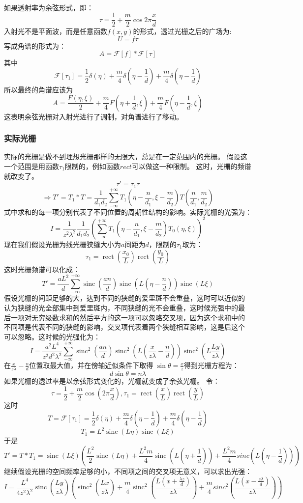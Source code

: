 \documentclass{article}
\DeclareMathOperator{\sinc}{sinc}
\DeclareMathOperator{\rect}{rect}
\begin{document}
\paragraph{}
如果透射率为余弦形式，即：
\[\tau=\frac{1}{2}+\frac{m}{2}\cos{2\pi \frac{x}{d}}\]
入射光不是平面波，而是任意函数$f(x,y)$的形式，透过光栅之后的广场为:
\[U=f\tau\]
写成角谱的形式为：
\[A=\mathscr{F}[f]*\mathscr{F}[\tau]\]
其中
\[\mathscr{F}[\tau_1]=\frac{1}{2}\delta(\eta)+\frac{m}{4}\delta(\eta-\frac{1}{d})+\frac{m}{4}\delta(\eta-\frac{1}{d})\]
所以最终的角谱应该为
\[A=\frac{F(\eta,\xi)}{2}+\frac{m}{4}F(\eta+\frac{1}{d},\xi)+\frac{m}{4}F(\eta-\frac{1}{d},\xi)\]
这表明余弦光栅对入射光进行了调制，对角谱进行了移动。
\subsubsection{实际光栅}
实际的光栅是做不到理想光栅那样的无限大，总是在一定范围内的光栅。
假设这一个范围是用函数$\tau_1$限制的，例如函数$rect$可以做这一种限制。
这时，光栅的频谱就改变了。
\[\tau'=\tau_1\tau\]
\[\Rightarrow
  T'=T_1*T=\frac{1}{d_1d_2}\sum_{-\infty}^{+\infty}T_1(\eta-\frac{n}{d_1},\xi-\frac{m}{d_2})T(\frac{n}{d_1},\frac{m}{d_2})\]
式中求和的每一项分别代表了不同位置的周期性结构的影响。实际光栅的光强为：
\[I=\frac{1}{z^2\lambda^2}\frac{1}{d_1d_2}(\sum_{-\infty}^{+\infty}T_1(\eta-\frac{n}{d_1},\xi-\frac{m}{d_2})T_0(\eta,\xi))^2\]
现在我们假设光栅为线光栅狭缝大小为$a$间距为$d$，限制的$\tau_1$取为：
\[\tau_1=\rect(\frac{x_0}{L})\rect(\frac{y_0}{L})\]
这时光栅频谱可以化成：
\[T'=\frac{aL^2}{d}\sum_{-\infty}^{+\infty}\sinc(\frac{an}{d})\sinc(L(\eta-\frac{n}{d}))\sinc(L\xi)\]
假设光栅的间距足够的大，达到不同的狭缝的爱里斑不会重叠，这时可以近似的
认为狭缝的光全部集中到爱里斑内，不同狭缝的光不会重叠，这时候光强中的最
后一项对无穷级数求和的然后平方的这一项可以忽略交叉项，因为这个求和中的
不同项是代表不同的狭缝的影响，交叉项代表着两个狭缝相互影响，这是后这个
可以忽略。这时候的光强化为：
\[I=\frac{a^2L^4}{z^2d^2\lambda^2}\sum_{-\infty}^{+\infty}\sinc^2(\frac{an}{d})\sinc^2(L(\frac{x}{z\lambda}-\frac{n}{d}))\sinc^2(L
  \frac{Ly}{z\lambda})\]
在$\frac{x}{z\lambda}-\frac{n}{d}$位置取最大值，并在傍轴近似条件下取得
$\sin{\theta}=\frac{x}{z}$得到光栅方程为：
\[d\sin{\theta}=n\lambda\]
如果光栅的透过率是以余弦形式变化的，光栅就变成了余弦光栅。
令：
\[\tau=\frac{1}{2}+\frac{m}{2}\cos(2\pi \frac{x}{d}),\tau_1=\rect(\frac{x}{L})\rect(\frac{y}{L})\]
这时
\[T=\mathscr{F}[\tau_1]=\frac{1}{2}\delta(\eta)+\frac{m}{4}\delta(\eta-\frac{1}{d})+\frac{m}{4}\delta(\eta-\frac{1}{d})\]
\[T_1=L^2\sinc(L\eta)\sinc(L\xi)\]
于是
\[T'=T*T_1=\sinc(L\xi)(\frac{L^2}{2}\sinc(L\eta)+\frac{L^2m}{4}\sinc(L(\eta+\frac{1}{d}))+\frac{L^2m}{4}sinc(L(\eta-\frac{1}{d})))\]
继续假设光栅的空间频率足够的小，不同项之间的交叉项无意义，可以求出光强：
\[I=\frac{L^4}{4z^2\lambda^2}\sinc(\frac{Ly}{z\lambda})(\sinc^2(\frac{Lx}{z\lambda})+\frac{m}{4}\sinc^2(\frac{L(x+\frac{\lambda
      z}{d})}{z\lambda})+\frac{m}{4}sinc^2(\frac{L(x-\frac{z\lambda}{d})}{z\lambda}))\]
\end{document}
